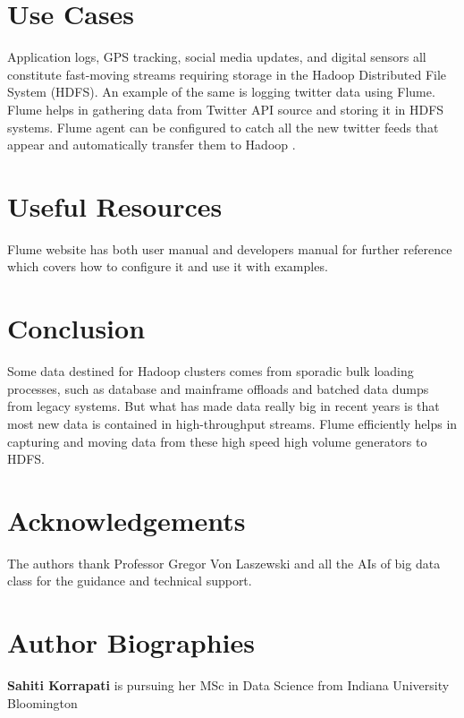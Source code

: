 \documentclass[9pt,twocolumn,twoside]{../../styles/osajnl}
\begin{document}
\section{Use Cases}
Application logs, GPS tracking, social media updates, and digital sensors all constitute fast-moving streams requiring storage in the Hadoop Distributed File System (HDFS). An example of the same is logging twitter data using Flume. Flume helps in gathering data from Twitter API source and storing it in HDFS systems. Flume agent can be configured to catch all the new twitter feeds that appear and automatically transfer them to Hadoop \cite{flume-application}.

\section{Useful Resources}
Flume website has both user manual \cite{user-manual} and developers manual \cite{dev-manual} for further reference which covers how to configure it and use it with examples.
\section{Conclusion}
Some data destined for Hadoop clusters comes from sporadic bulk loading processes, such as database and mainframe offloads and batched data dumps from legacy systems. But what has made data really big in recent years is that most new data is contained in high-throughput streams. Flume efficiently helps in capturing and moving data from these high speed high volume generators to HDFS.

\section*{Acknowledgements}

The authors thank Professor Gregor Von Laszewski and all the AIs of big data class for the guidance and technical support.



 
\section*{Author Biographies}
\begingroup
\setlength\intextsep{0pt}
\begin{minipage}[t][3.2cm][t]{1.0\columnwidth} %
  \noindent
  {\bfseries Sahiti Korrapati} is pursuing her MSc in Data Science from
  Indiana University Bloomington
\end{minipage}
\endgroup
\end{document}
